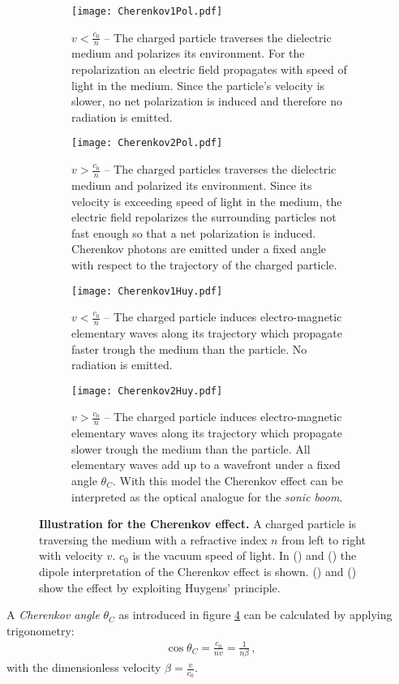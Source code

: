 \begin{figure}[H]
	\centering
	\begin{subfigure}[t]{0.45\textwidth}
		\texttt{[image: Cherenkov1Pol.pdf]}
		\caption{$v < \frac{c_0}{n}$ -- The charged particle traverses the dielectric medium and polarizes its environment. For the repolarization an electric field propagates with speed of light in the medium. Since the particle's velocity is slower, no net polarization is induced and therefore no radiation is emitted.}
		\label{airshowers:cherenkov1pol}
	\end{subfigure}
	\hfill
	\begin{subfigure}[t]{0.45\textwidth}
		\texttt{[image: Cherenkov2Pol.pdf]}
		\caption{$v > \frac{c_0}{n}$ -- The charged particles traverses the dielectric medium and polarized its environment. Since its velocity is exceeding speed of light in the medium, the electric field repolarizes the surrounding particles not fast enough so that a net polarization is induced. Cherenkov photons are emitted under a fixed angle with respect to the trajectory of the charged particle.}
		\label{airshowers:cherenkov2pol}
	\end{subfigure}
	\begin{subfigure}[t]{0.45\textwidth}
		\texttt{[image: Cherenkov1Huy.pdf]}
		\caption{$v < \frac{c_0}{n}$ -- The charged particle induces electro-magnetic elementary waves along its trajectory which propagate faster trough the medium than the particle. No radiation is emitted.}
		\label{airshowers:cherenkov1huy}
	\end{subfigure}
	\hfill
	\begin{subfigure}[t]{0.45\textwidth}
		\texttt{[image: Cherenkov2Huy.pdf]}
		\caption{$v > \frac{c_0}{n}$ -- The charged particle induces electro-magnetic elementary waves along its trajectory which propagate slower trough the medium than the particle. All elementary waves add up to a wavefront under a fixed angle $\theta_C$. With this model the Cherenkov effect can be interpreted as the optical analogue for the \textit{sonic boom}.}
		\label{airshowers:cherenkov2huy}
	\end{subfigure}
	\caption[Illustration for the Cherenkov effect]{\textbf{Illustration for the Cherenkov effect.} A charged particle is traversing the medium with a refractive index $n$ from left to right with velocity $v$. $c_0$ is the vacuum speed of light. In () and () the dipole interpretation of the Cherenkov effect is shown. () and () show the effect by exploiting Huygens' principle.}
	\label{airshowers:cherenkov}
\end{figure}
A \textit{Cherenkov angle} $\theta_C$ as introduced in figure \ref{airshowers:cherenkov2huy} can be calculated by applying trigonometry:
\begin{align}
	\cos{\theta_C} = \frac{c_0}{nv} = \frac{1}{n\beta}\,,
\end{align}
with the dimensionless velocity $\beta = \frac{v}{c_0}$.

